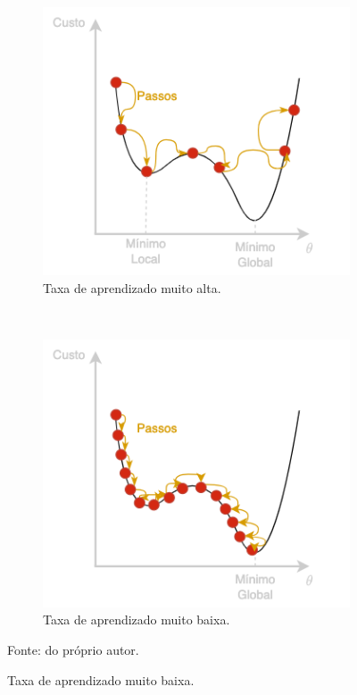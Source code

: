 \begin{figure}[H]
   \caption{Representação de atualização da taxa de aprendizado.}
   \centering
   \label{deep:fig:dynamic_lr}
    \begin{subfigure}[t]{0.45\textwidth}
        \centering
        \includegraphics[width=1\linewidth]{recursos/imagens/deep/lr_high.png}
        \caption{Taxa de aprendizado muito alta.}
        \label{deep:fig:dynamic_lr.1}
    \end{subfigure}%
    ~ 
    \begin{subfigure}[t]{0.45\textwidth}
        \centering
        \includegraphics[width=1\linewidth]{recursos/imagens/deep/lr_low.png}
        \caption{Taxa de aprendizado muito baixa.}
        \label{deep:fig:dynamic_lr.2}
    \end{subfigure}%

    Fonte: do próprio autor.
\end{figure}

